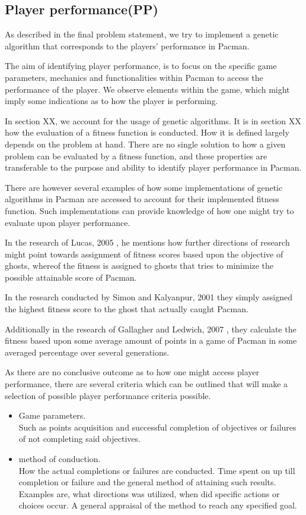 \subsection{Player performance(PP)}

As described in the final problem statement, we try to implement a genetic algorithm that corresponds to the players' performance in Pacman.


The aim of identifying player performance, is to focus on the specific game parameters, mechanics and functionalities within Pacman to access the performance of the player. We observe elements within the game, which might imply some indications as to how the player is performing.

In section XX, we account for the usage of genetic algorithms. It is in section XX how the evaluation of a fitness function is conducted. How it is defined largely depends on the problem at hand. There are no single solution to how a given problem can be evaluated by a fitness function, and these properties are transferable to the purpose and ability to identify player performance in Pacman.

There are however several examples of how some implementations of genetic algorithms in Pacman are accessed to account for their implemented fitness function. Such implementations can provide knowledge of how one might try to evaluate upon player performance.

In the research of Lucas, 2005 \cite{Lucas2005}, he mentions how further directions of research might point towards assignment of fitness scores based upon the objective of ghosts, whereof the fitness is assigned to ghosts that tries to minimize the possible attainable score of Pacman.

In the research conducted by Simon and Kalyanpur, 2001 \cite{Kalyanpur2001} they simply assigned the highest fitness score to the ghost that actually caught Pacman.

Additionally in the research of Gallagher and Ledwich, 2007 \cite{Gallagher2007}, they calculate the fitness based upon some average amount of points in a game of Pacman in some averaged percentage over several generations.

As there are no conclusive outcome as to how one might access player performance, there are several criteria which can be outlined that will make a selection of possible player performance criteria possible.

\begin{itemize}
\item Game parameters.\\
Such as points acquisition and successful completion of objectives or failures of not completing said objectives.
\item method of conduction.\\
How the actual completions or failures are conducted. Time spent on up till completion or failure and the general method of attaining such results. Examples are, what directions was utilized, when did specific actions or choices occur. A general appraisal of the method to reach any specified goal.
\end{itemize}

